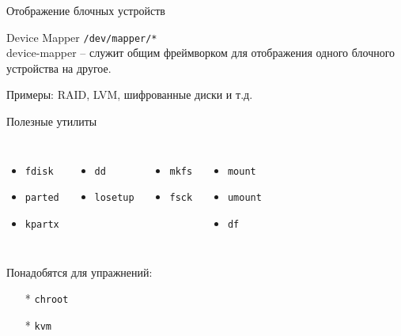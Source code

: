 \documentclass[ignorenonframetext, professionalfonts, hyperref={pdftex, unicode}]{beamer}
\begin{document}
\begin{frame}{Отображение блочных устройств}


	\begin{block}{Device Mapper}
			{\tt /dev/mapper/*}\\
			device-mapper -- служит общим фреймворком для отображения одного блочного устройства на другое.

			Примеры: RAID, LVM, шифрованные диски и т.д.
	\end{block}

\end{frame}



\begin{frame}{Полезные утилиты}
	\begin{columns}
		\begin{itemize}
			\item {\tt fdisk}
			\item {\tt parted}
			\item {\tt kpartx}
		\end{itemize}
		\begin{itemize}
			\item {\tt dd}
			\item {\tt losetup}
		\end{itemize}
		\begin{itemize}
			\item {\tt mkfs}
			\item {\tt fsck}
		\end{itemize}
		\begin{itemize}
			\item {\tt mount}
			\item {\tt umount}
			\item {\tt df}
		\end{itemize}
	\end{columns}

	\bigskip
	Понадобятся для упражнений:
	\begin{itemize}
			\item[*] {\tt chroot}
			\item[*] {\tt kvm}
	\end{itemize}
\end{frame}
\end{document}
